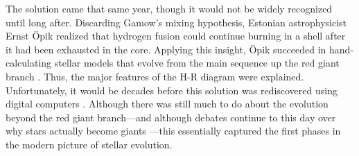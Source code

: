 The solution came that same year, though it would not be widely recognized until long after. 
Discarding Gamow's mixing hypothesis, Estonian astrophysicist Ernst \"Opik realized that hydrogen fusion could continue burning in a shell after it had been exhausted in the core. 
Applying this insight, \"Opik succeeded in hand-calculating stellar models that evolve from the main sequence up the red giant branch \citep{1938PTarO..30C...1O}. 
Thus, the major features of the H-R diagram were explained. 
Unfortunately, it would be decades before this solution was rediscovered using digital computers \citep[e.g.,][]{ARNY1990211}. 
Although there was still much to do about the evolution beyond the red giant branch---and although debates continue to this day over why stars actually become giants \citep[e.g.,][etc.]{10.1007/978-94-009-8492-9_18,1992ApJ...400..280R,1983A&A...127..411W,1985ApJ...296..554Y,1988ApJ...329..803A,1989MNRAS.236..505W,1991AnPh...16..515W,2000ApJ...538..837S}---this essentially captured the first phases in the modern picture of stellar evolution. 






